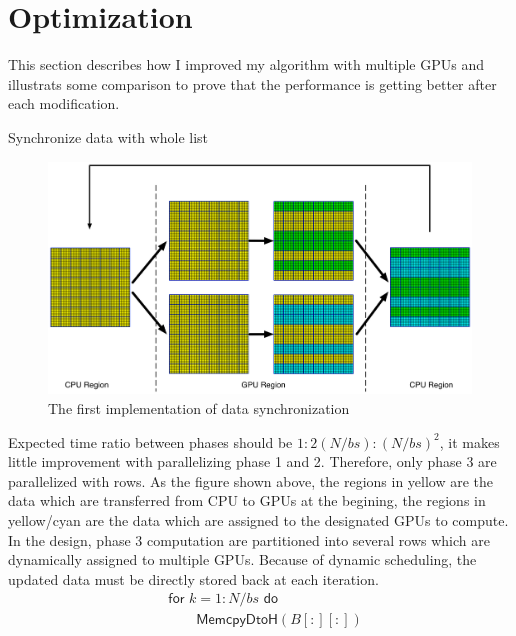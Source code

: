 \documentclass[12pt]{article}
\makeatletter
\renewenvironment{itemize}
{\list{$\bullet$}{\leftmargin\z@ \labelwidth\z@ \itemindent-\leftmargin
\let\makelabel\descriptionlabel}}
{\endlist}
\makeatother
\begin{document}
\newpage

\section*{Optimization}
\vspace{-20pt}
\noindent\makebox[\linewidth]{\rule{\textwidth}{0.4pt}}
\vspace{5pt}

This section describes how I improved my algorithm with multiple GPUs and illustrats some comparison to prove that the performance is getting better after each modification.

\begin{itemize}
    \item Synchronize data with whole list
    \begin{figure}[ht]
        \includegraphics[scale=.25]{./multiGPU_algo_diagram1.png}
        \caption{The first implementation of data synchronization}
    \end{figure}
    \begin{flushleft}
        Expected time ratio between phases should be $1:2(N/bs):(N/bs)^2$, it makes little improvement with parallelizing phase 1 and 2. Therefore, only phase 3 are parallelized with rows. As the figure shown above, the regions in yellow are the data which are transferred from CPU to GPUs at the begining, the regions in yellow/cyan are the data which are assigned to the designated GPUs to compute. In the design, phase 3 computation are partitioned into several rows which are dynamically assigned to multiple GPUs. Because of dynamic scheduling, the updated data must be directly stored back at each iteration.
        \begin{align*}
            &\mathsf{for} \,\, k = 1:N/bs \,\, \mathsf{do} \\
            &\quad \quad \mathsf{MemcpyDtoH} (B[:][:]) \\

\end{align*}
\end{flushleft}
\end{itemize}
\end{document}
